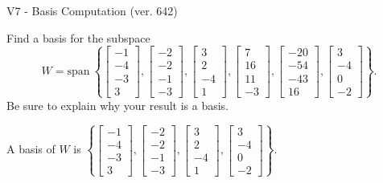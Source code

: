 \begin{exercise}
  \begin{exerciseTitle}V7 - Basis Computation (ver. 642)\end{exerciseTitle}
  \begin{exerciseStatement}
    Find a basis for the subspace 
\[W=\mathrm{span}\ \left\{\left[\begin{array}{r}
-1 \\
-4 \\
-3 \\
3
\end{array}\right] , \left[\begin{array}{r}
-2 \\
-2 \\
-1 \\
-3
\end{array}\right] , \left[\begin{array}{r}
3 \\
2 \\
-4 \\
1
\end{array}\right] , \left[\begin{array}{r}
7 \\
16 \\
11 \\
-3
\end{array}\right] , \left[\begin{array}{r}
-20 \\
-54 \\
-43 \\
16
\end{array}\right] , \left[\begin{array}{r}
3 \\
-4 \\
0 \\
-2
\end{array}\right]\right\}.\]
 Be sure to explain why your result is a basis.


  \end{exerciseStatement}
  \begin{exerciseAnswer}
   A basis of \(W\) is  \(\left\{\left[\begin{array}{r}
-1 \\
-4 \\
-3 \\
3
\end{array}\right] , \left[\begin{array}{r}
-2 \\
-2 \\
-1 \\
-3
\end{array}\right] , \left[\begin{array}{r}
3 \\
2 \\
-4 \\
1
\end{array}\right] , \left[\begin{array}{r}
3 \\
-4 \\
0 \\
-2
\end{array}\right]\right\}\).
  


  \end{exerciseAnswer}
\end{exercise}